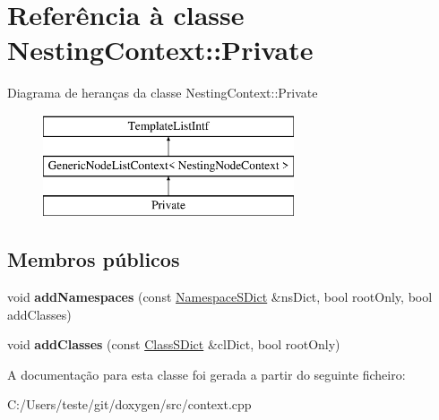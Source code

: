 \hypertarget{class_nesting_context_1_1_private}{\section{Referência à classe Nesting\-Context\-:\-:Private}
\label{class_nesting_context_1_1_private}
}
Diagrama de heranças da classe Nesting\-Context\-:\-:Private\begin{figure}[H]
\begin{center}
\leavevmode
\includegraphics[height=3.000000cm]{class_nesting_context_1_1_private}
\end{center}
\end{figure}
\subsection*{Membros públicos}
\begin{DoxyCompactItemize}
\item 
\hypertarget{class_nesting_context_1_1_private_af079a2e7358b50382a0035949511374f}{void {\bfseries add\-Namespaces} (const \hyperlink{class_namespace_s_dict}{Namespace\-S\-Dict} \&ns\-Dict, bool root\-Only, bool add\-Classes)}\label{class_nesting_context_1_1_private_af079a2e7358b50382a0035949511374f}

\item 
\hypertarget{class_nesting_context_1_1_private_a817b872b1eaea343ea0e3002964eb73b}{void {\bfseries add\-Classes} (const \hyperlink{class_class_s_dict}{Class\-S\-Dict} \&cl\-Dict, bool root\-Only)}\label{class_nesting_context_1_1_private_a817b872b1eaea343ea0e3002964eb73b}

\end{DoxyCompactItemize}


A documentação para esta classe foi gerada a partir do seguinte ficheiro\-:\begin{DoxyCompactItemize}
\item 
C\-:/\-Users/teste/git/doxygen/src/context.\-cpp\end{DoxyCompactItemize}
